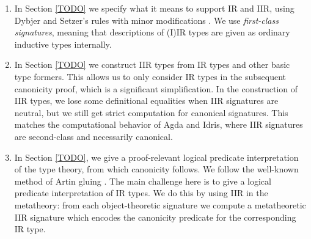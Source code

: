 \documentclass[acmsmall,screen,review,anonymous]{acmart}
\begin{document}


\begin{enumerate}
\item In Section \ref{TODO} we specify what it means to support IR and IIR, using Dybjer and
  Setzer's rules with minor modifications \cite{TODO}. We use \emph{first-class signatures},
  meaning that descriptions of (I)IR types are given as ordinary inductive types internally.
\item In Section \ref{TODO} we construct IIR types from IR types and other basic type formers. This
  allows us to only consider IR types in the subsequent canonicity proof, which is a significant
  simplification. In the construction of IIR types, we lose some definitional equalities when IIR
  signatures are neutral, but we still get strict computation for canonical signatures. This matches
  the computational behavior of Agda and Idris, where IIR signatures are second-class and
  necessarily canonical.
\item In Section \ref{TODO}, we give a proof-relevant logical predicate interpretation of the type
  theory, from which canonicity follows. We follow the well-known method of Artin gluing
  \cite{TODO}. The main challenge here is to give a logical predicate interpretation of IR types. We
  do this by using IIR in the metatheory: from each object-theoretic signature we compute a
  metatheoretic IIR signature which encodes the canonicity predicate for the corresponding IR type.

\end{enumerate}
\end{document}
